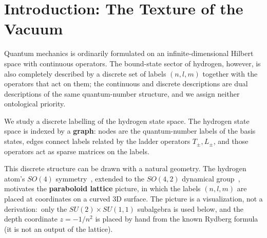 \documentclass[aps,pra,twocolumn,superscriptaddress,longbibliography]{revtex4-2}
\begin{document}
\begin{abstract}
the CG-magnitude construction $\Theta \equiv 0$). \textbf{This model describes only the electron's state space:}\ it contains no electromagnetic coupling, and we find no trace of the fine structure constant $\alpha$ in it (a companion paper~\cite{companion_alpha} records a separate numerical Observation about $\alpha$, not a coupling mechanism).
\end{abstract}

\maketitle

\section{Introduction: The Texture of the Vacuum}

Quantum mechanics is ordinarily formulated on an infinite-dimensional Hilbert space with continuous operators. The bound-state sector of hydrogen, however, is also completely described by a discrete set of labels $(n, l, m)$ together with the operators that act on them; the continuous and discrete descriptions are dual descriptions of the same quantum-number structure, and we assign neither ontological priority.

We study a discrete labelling of the hydrogen state space. The hydrogen state space is indexed by a \textbf{graph}: nodes are the quantum-number labels of the basis states, edges connect labels related by the ladder operators $T_\pm, L_\pm$, and those operators act as sparse matrices on the labels.

This discrete structure can be drawn with a natural geometry. The hydrogen atom's $SO(4)$ symmetry~\cite{fock1935}, extended to the $SO(4,2)$ dynamical group~\cite{malkin_manko1965,fronsdal1967,barut1967}, motivates the \textbf{paraboloid lattice} picture, in which the labels $(n, l, m)$ are placed at coordinates on a curved 3D surface. The picture is a visualization, not a derivation:\ only the $SU(2)\times SU(1,1)$ subalgebra is used below, and the depth coordinate $z = -1/n^2$ is placed by hand from the known Rydberg formula (it is not an output of the lattice).
\end{document}
